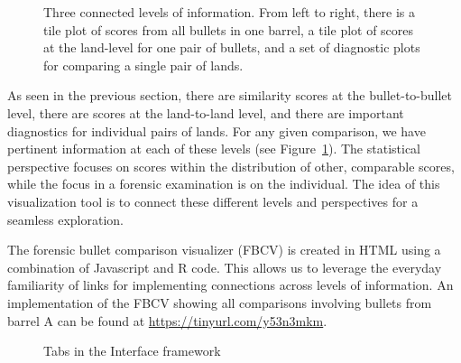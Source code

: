 \documentclass[
  12pt]{article}
\begin{document}
\begin{figure}


\caption{\label{fig-tool-pipeline}Three connected levels of information.
From left to right, there is a tile plot of scores from all bullets in
one barrel, a tile plot of scores at the land-level for one pair of
bullets, and a set of diagnostic plots for comparing a single pair of
lands.}

\end{figure}%

As seen in the previous section, there are similarity scores at the
bullet-to-bullet level, there are scores at the land-to-land level, and
there are important diagnostics for individual pairs of lands. For any
given comparison, we have pertinent information at each of these levels
(see Figure~\ref{fig-tool-pipeline}). The statistical perspective
focuses on scores within the distribution of other, comparable scores,
while the focus in a forensic examination is on the individual. The idea
of this visualization tool is to connect these different levels and
perspectives for a seamless exploration.

The forensic bullet comparison visualizer (FBCV) is created in HTML
using a combination of Javascript and R code. This allows us to leverage
the everyday familiarity of links for implementing connections across
levels of information. An implementation of the FBCV showing all
comparisons involving bullets from barrel A can be found at
\url{https://tinyurl.com/y53n3mkm}.

\begin{figure}


\caption{\label{fig-framework-interface}Tabs in the Interface framework}

\end{figure}%
\end{document}
